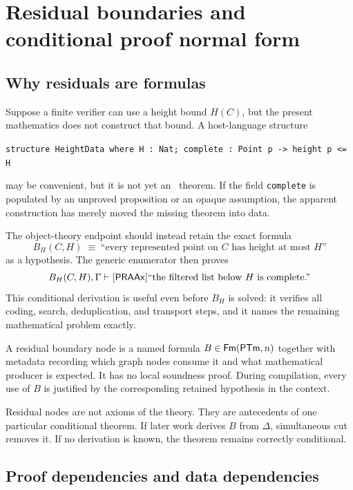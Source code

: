 \section{Residual boundaries and conditional proof normal form}\label{sec:residuals}

\subsection{Why residuals are formulas}

Suppose a finite verifier can use a height bound \(H(C)\), but the present mathematics does not construct that bound.  A host-language structure
\begin{center}
\texttt{structure HeightData where H : Nat; complete : Point p -> height p <= H}
\end{center}
may be convenient, but it is not yet an \iPRA\ theorem.  If the field \texttt{complete} is populated by an unproved proposition or an opaque assumption, the apparent construction has merely moved the missing theorem into data.

The object-theory endpoint should instead retain the exact formula
\[
 B_H(C,H)\;\equiv\;\text{``every represented point on \(C\) has height at most \(H\)''}
\]
as a hypothesis.  The generic enumerator then proves
\[
 B_H(C,H),\Gamma\vdash[\mathsf{PRAAx}]\text{``the filtered list below \(H\) is complete.''}
\]
This conditional derivation is useful even before \(B_H\) is solved: it verifies all coding, search, deduplication, and transport steps, and it names the remaining mathematical problem exactly.

\begin{definition}
A residual boundary node is a named formula \(B\in\mathsf{Fm}(\mathsf{PTm},n)\) together with metadata recording which graph nodes consume it and what mathematical producer is expected.  It has no local soundness proof.  During compilation, every use of \(B\) is justified by the corresponding retained hypothesis in the context.
\end{definition}

Residual nodes are not axioms of the theory.  They are antecedents of one particular conditional theorem.  If later work derives \(B\) from \(\Delta\), simultaneous cut removes it.  If no derivation is known, the theorem remains correctly conditional.

\subsection{Proof dependencies and data dependencies}

